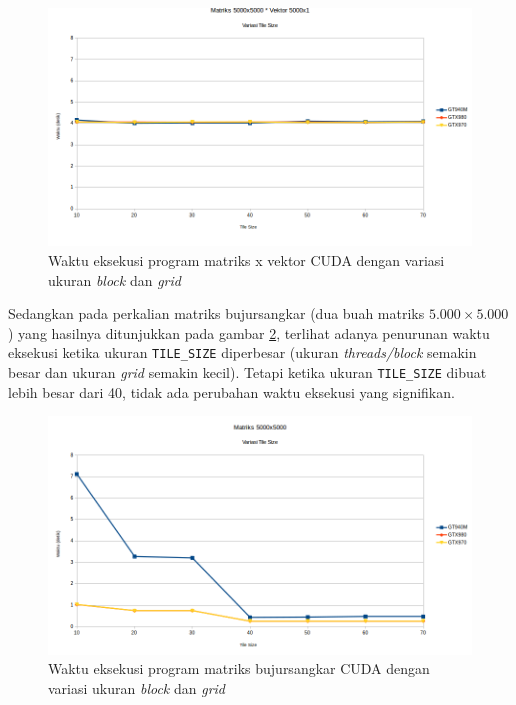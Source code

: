 \begin{figure}
	\centering
	\includegraphics[width=1\textwidth]
	{pics/block_grid_mv}
	\caption{Waktu eksekusi program matriks x vektor CUDA dengan variasi ukuran \textit{block} dan \textit{grid}}
	\label{fig:block_grid_mv}
\end{figure}  

Sedangkan pada perkalian matriks bujursangkar (dua buah matriks $5.000 \times 5.000$) yang hasilnya ditunjukkan pada gambar \ref{fig:block_grid_mm}, terlihat adanya penurunan waktu eksekusi ketika ukuran \verb|TILE_SIZE| diperbesar (ukuran \textit{threads/block} semakin besar dan ukuran \textit{grid} semakin kecil). Tetapi ketika ukuran \verb|TILE_SIZE| dibuat lebih besar dari 40, tidak ada perubahan waktu eksekusi yang signifikan.

\begin{figure}
	\centering
	\includegraphics[width=1\textwidth]
	{pics/block_grid_mm}
	\caption{Waktu eksekusi program matriks bujursangkar CUDA dengan variasi ukuran \textit{block} dan \textit{grid}}
	\label{fig:block_grid_mm}
\end{figure}  

